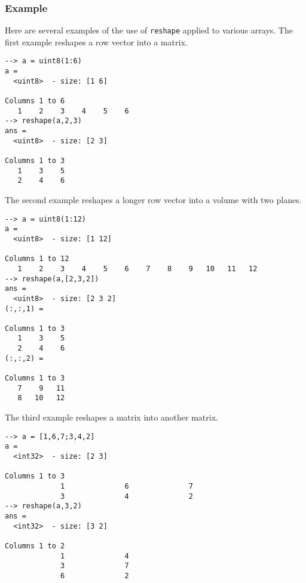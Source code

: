 \subsubsection{Example}
Here are several examples of the use of \verb|reshape| applied to
various arrays.  The first example reshapes a row vector into a 
matrix.
\begin{verbatim}
--> a = uint8(1:6)
a =
  <uint8>  - size: [1 6]
  
Columns 1 to 6
   1    2    3    4    5    6
--> reshape(a,2,3)
ans =
  <uint8>  - size: [2 3]
  
Columns 1 to 3
   1    3    5
   2    4    6
\end{verbatim}
The second example reshapes a longer row vector into a volume with 
two planes.
\begin{verbatim}
--> a = uint8(1:12)
a =
  <uint8>  - size: [1 12]
  
Columns 1 to 12
   1    2    3    4    5    6    7    8    9   10   11   12
--> reshape(a,[2,3,2])
ans =
  <uint8>  - size: [2 3 2]
(:,:,1) =
  
Columns 1 to 3
   1    3    5
   2    4    6
(:,:,2) =
  
Columns 1 to 3
   7    9   11
   8   10   12
\end{verbatim}
The third example reshapes a matrix into another matrix.
\begin{verbatim}
--> a = [1,6,7;3,4,2]
a =
  <int32>  - size: [2 3]
  
Columns 1 to 3
             1              6              7
             3              4              2
--> reshape(a,3,2)
ans =
  <int32>  - size: [3 2]
  
Columns 1 to 2
             1              4
             3              7
             6              2  
\end{verbatim}
